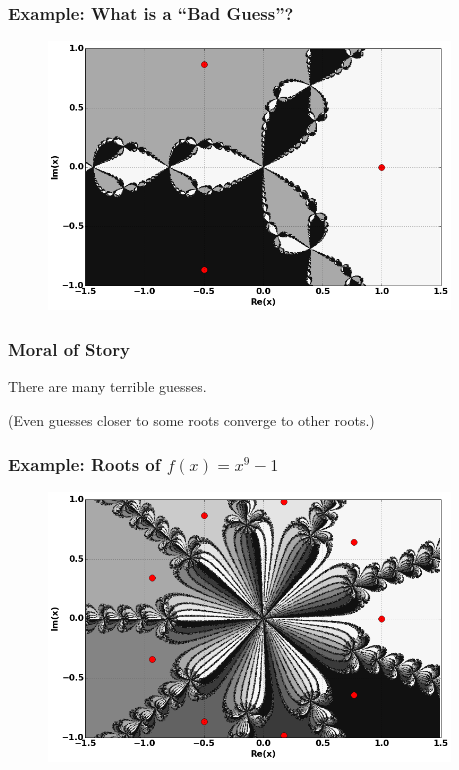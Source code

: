 \documentclass{beamer}
\begin{document}
\begin{frame}
  \frametitle{Example: What is a ``Bad Guess''?}
  \begin{figure}
    \centering
    \includegraphics[width=0.95\textwidth]{images/newton.png}
  \end{figure}
\end{frame}




\begin{frame}
  \frametitle{Moral of Story}

  \begin{center}
    {\Huge There are many terrible guesses.}
  \end{center}

  \pause

  \vspace{3cm}

  \begin{center}
    (Even guesses closer to some roots converge to other roots.)
  \end{center}
\end{frame}



\begin{frame}
  \frametitle{Example: Roots of $f(x) = x^9 - 1$}
  \begin{figure}
    \centering
    \includegraphics[width=0.95\textwidth]{images/newtonalt.png}
  \end{figure}
\end{frame}
\end{document}
